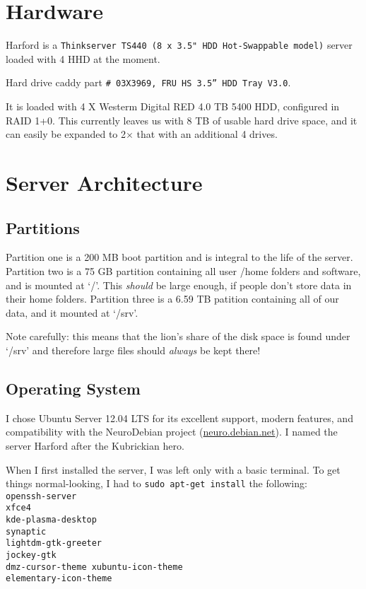 \documentclass[final,titlepage,letterpaper,oneside,12pt]{article}
\begin{document}
\section{Hardware}

Harford is a \verb=Thinkserver TS440 (8 x 3.5" HDD Hot-Swappable model)= server loaded with 4 HHD at the moment.

Hard drive caddy part \verb=# 03X3969, FRU HS 3.5” HDD Tray V3.0=.

It is loaded with 4 X Westerm Digital RED 4.0 TB 5400 HDD, configured in RAID 1+0. This currently leaves us with 8 TB of usable hard drive space, and it can easily be expanded to 2$\times$ that with an additional 4 drives.

\section{Server Architecture}
\subsection{Partitions}
Partition one is a 200 MB boot partition and is integral to the life of the server. Partition two is a 75 GB partition containing all user /home folders and software, and is mounted at `/'. This \textit{should} be large enough, if people don't store data in their home folders. Partition three is a 6.59 TB patition containing all of our data, and it mounted at `/srv'.

Note carefully: this means that the lion's share of the disk space is found under `/srv' and therefore large files should \textit{always} be kept there!

\subsection{Operating System}

I chose Ubuntu Server 12.04 LTS for its excellent support, modern features, and compatibility with the NeuroDebian project (\url{neuro.debian.net}). I named the server Harford after the Kubrickian hero.

When I first installed the server, I was left only with a basic terminal. To get things normal-looking, I had to \texttt{sudo apt-get install} the following: \\

\noindent
\texttt{openssh-server \\
xfce4 \\
kde-plasma-desktop \\
synaptic \\
lightdm-gtk-greeter \\
jockey-gtk \\
dmz-cursor-theme 
xubuntu-icon-theme \\
elementary-icon-theme
}
\end{document}
